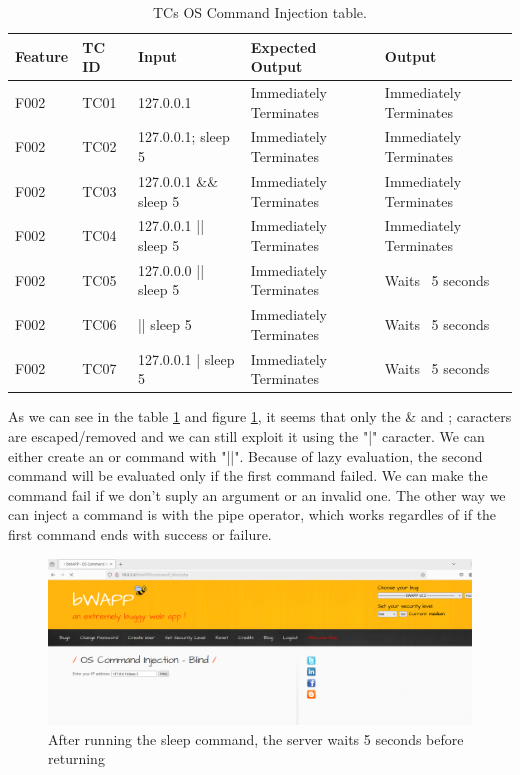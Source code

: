 \documentclass{article}
\begin{document}
\begin{table} [htpb]
    \centering
    \begin{tabular}{l|l|l|l|l}
        Feature & TC ID & Input                  & Expected Output        & Output                 \\ \hline
        F002    & TC01  & 127.0.0.1              & Immediately Terminates & Immediately Terminates \\
        F002    & TC02  & 127.0.0.1; sleep 5     & Immediately Terminates & Immediately Terminates \\
        F002    & TC03  & 127.0.0.1 \&\& sleep 5 & Immediately Terminates & Immediately Terminates \\
        F002    & TC04  & 127.0.0.1 || sleep 5   & Immediately Terminates & Immediately Terminates \\
        F002    & TC05  & 127.0.0.0 || sleep 5   & Immediately Terminates & Waits ~5 seconds       \\
        F002    & TC06  & || sleep 5             & Immediately Terminates & Waits ~5 seconds       \\
        F002    & TC07  & 127.0.0.1 | sleep 5    & Immediately Terminates & Waits ~5 seconds       \\
    \end{tabular}
    \caption{\label{tab:TC-command-injection}TCs OS Command Injection table.}
\end{table}

As we can see in the table \ref{tab:TC-command-injection} and figure \ref{fig:sleep-command}, it seems that only the \& and ; caracters are escaped/removed and we can still exploit it using the "|" caracter.
We can either create an or command with "||". Because of lazy evaluation, the second command will be evaluated only if the first command failed.
We can make the command fail if we don't suply an argument or an invalid one.
The other way we can inject a command is with the pipe operator, which works regardles of if the first command ends with success or failure.

\begin{figure}[H]
    \centering
    \includegraphics[width=1\linewidth]{Figures/command-injection/sleep-command.png}
    \caption{\label{fig:sleep-command}After running the sleep command, the server waits 5 seconds before returning}
\end{figure}
\end{document}
